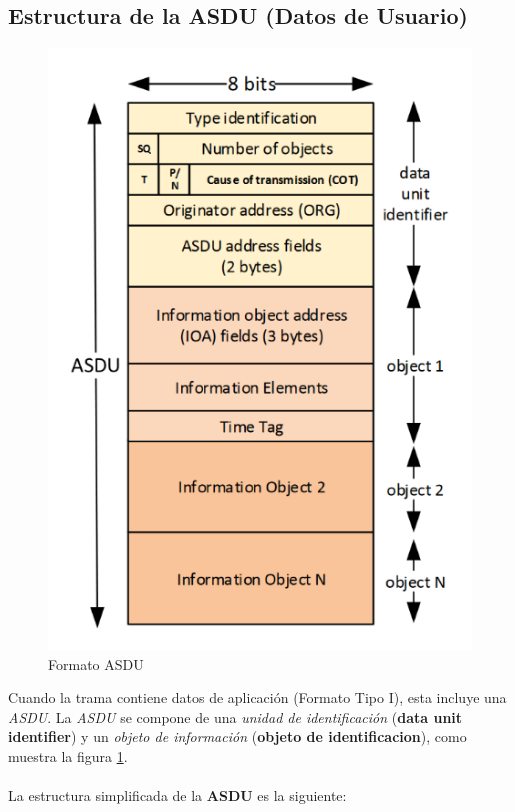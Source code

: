 \documentclass[a5paper]{book}%
\begin{document}
\subsection{Estructura de la ASDU (Datos de Usuario)}

\begin{figure}[H]
	\centering
	\caption{Formato ASDU}
	\label{fig:formatoasdu}
	\includegraphics[width=0.7\linewidth]{formato_ASDU}
\end{figure}


Cuando la trama contiene datos de aplicación (Formato Tipo I), esta incluye una \textit{ASDU}. La \textit{ASDU} se compone de una \textit{unidad de identificación} (\textbf{data unit identifier}) y un \textit{objeto de información} (\textbf{objeto de identificacion}),  como muestra la figura \ref{fig:formatoasdu}.\\\\

La estructura simplificada de la \textbf{ASDU} es la siguiente:
\end{document}
